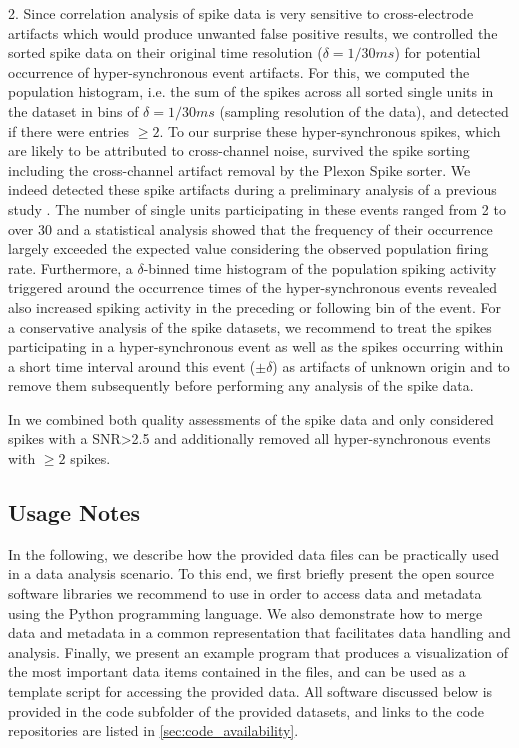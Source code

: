 {2. Since correlation analysis of spike data is very sensitive to cross-electrode artifacts which would produce unwanted false positive results, we controlled the sorted spike data on their original time resolution ($\delta=1/30ms$) for potential occurrence of hyper-synchronous event artifacts. For this, we computed the population histogram, i.e. the sum of the spikes across all sorted single units in the dataset in bins of $\delta=1/30ms$ (sampling resolution of the data), and detected if there were entries $\ge2$. To our surprise these hyper-synchronous spikes, which are likely to be attributed to cross-channel noise, survived the spike sorting including the cross-channel artifact removal by the Plexon Spike sorter. We indeed detected these spike artifacts during a preliminary analysis of a previous study \cite{Torre_2016}. The number of single units participating in these events ranged from 2 to over 30 and a statistical analysis showed that the frequency of their occurrence largely exceeded the expected value considering the observed population firing rate. Furthermore, a $\delta$-binned time histogram of the population spiking activity triggered around the occurrence times of the hyper-synchronous events revealed also increased spiking activity in the preceding or following bin of the event. For a conservative analysis of the spike datasets, we recommend to treat the spikes participating in a hyper-synchronous event as well as the spikes occurring within a short time interval around this event ($\scriptstyle \pm\delta$) as artifacts of unknown origin and to remove them subsequently before performing any analysis of the spike data.

In \cite{Torre_2016} we combined both quality assessments of the spike data and only considered spikes with a SNR>2.5 and additionally removed all hyper-synchronous events with $\ge2$ spikes. 

\subsection{Usage Notes}
\label{sec:usage}

In the following, we describe how the provided data files can be practically used in a data analysis scenario. To this end, we first briefly present the open source software libraries we recommend to use in order to access data and metadata using the Python programming language. We also demonstrate how to merge data and metadata in a common representation that facilitates data handling and analysis. Finally, we present an example program that produces a visualization of the most important data items contained in the files, and can be used as a template script for accessing the provided data. All software discussed below is provided in the code subfolder of the provided datasets, and links to the code repositories are listed in \cref{sec:code_availability}.

}

